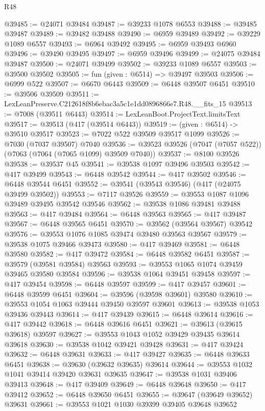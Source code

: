 \begin{lexlean}{R48}
\begin{coremodule}
@39485 := @24071 @39484
@39487 := @39233 @1078 @6553
@39488 := @39485 @39487
@39489 := @39482 @39488
@39490 := @6959 @39489
@39492 := @39229 @1089 @6557
@39493 := @6964 @39492
@39495 := @6959 @39493 @6960
@39496 := @39490 @39495
@39497 := @6959 @39496
@39499 := @24075 @39484 @39487
@39500 := @24071 @39499
@39502 := @39233 @1089 @6557
@39503 := @39500 @39502
@39505 := fun (given : @6514) => @39497 @39503
@39506 := @6999 @522
@39507 := @6670 @6443
@39509 := @6448 @39507 @6451
@39510 := @39506 @39509
@39511 := LexLeanPreserve.C212618f8b6ebac3a5c1e1dd0896866e7.R48.__fits_15
@39513 := @7008 (@39511 @6443)
@39514 := LexLeanBoot.ProjectText.limitsText
@39517 := @39513 (@417 (@39514 @6443))
@39519 := (given : @6514) -> @39510 @39517
@39523 := @7022 @522 @39509 @39517 @1099
@39526 := @7030 (@7037 @39507) @7040
@39536 := @39523 @39526 (@7047 (@7057 @522)) (@7063 (@7064 (@7065 @1099) @39509 @7040))
@39537 := @8100 @39526
@39538 := @39537 @45
@39541 := @39538 @1097 @39496 @39503
@39542 := @417 @39499
@39543 := @6448 @39542
@39544 := @417 @39502
@39546 := @6448 @39544 @6451
@39552 := @39541 (@39543 @39546) (@417 (@24075 @39499 @39502))
@39553 := @7117 @39526
@39559 := @39553 @1087 @1096 @39489 @39495 @39542 @39546
@39562 := @39538 @1086 @39481 @39488
@39563 := @417 @39484
@39564 := @6448 @39563
@39565 := @417 @39487
@39567 := @6448 @39565 @6451
@39570 := @39562 (@39564 @39567) @39542
@39576 := @39553 @1076 @1085 @39474 @39480 @39563 @39567
@39579 := @39538 @1075 @39466 @39473
@39580 := @417 @39469
@39581 := @6448 @39580
@39582 := @417 @39472
@39584 := @6448 @39582 @6451
@39587 := @39579 (@39581 @39584) @39563
@39593 := @39553 @1065 @1074 @39459 @39465 @39580 @39584
@39596 := @39538 @1064 @39451 @39458
@39597 := @417 @39454
@39598 := @6448 @39597
@39599 := @417 @39457
@39601 := @6448 @39599 @6451
@39604 := @39596 (@39598 @39601) @39580
@39610 := @39553 @1054 @1063 @39444 @39450 @39597 @39601
@39613 := @39538 @1053 @39436 @39443
@39614 := @417 @39439
@39615 := @6448 @39614
@39616 := @417 @39442
@39618 := @6448 @39616 @6451
@39621 := @39613 (@39615 @39618) @39597
@39627 := @39553 @1043 @1052 @39429 @39435 @39614 @39618
@39630 := @39538 @1042 @39421 @39428
@39631 := @417 @39424
@39632 := @6448 @39631
@39633 := @417 @39427
@39635 := @6448 @39633 @6451
@39638 := @39630 (@39632 @39635) @39614
@39644 := @39553 @1032 @1041 @39414 @39420 @39631 @39635
@39647 := @39538 @1031 @39406 @39413
@39648 := @417 @39409
@39649 := @6448 @39648
@39650 := @417 @39412
@39652 := @6448 @39650 @6451
@39655 := @39647 (@39649 @39652) @39631
@39661 := @39553 @1021 @1030 @39399 @39405 @39648 @39652

\end{coremodule}
\end{lexlean}
